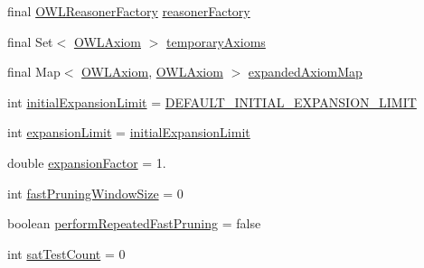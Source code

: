 \begin{DoxyCompactItemize}
\item 
final \hyperlink{interfaceorg_1_1semanticweb_1_1owlapi_1_1reasoner_1_1_o_w_l_reasoner_factory}{O\-W\-L\-Reasoner\-Factory} \hyperlink{classorg_1_1semanticweb_1_1owlapi_1_1debugging_1_1_black_box_o_w_l_debugger_ae2abfae902c03812db4b1cd8bb179612}{reasoner\-Factory}
\item 
final Set$<$ \hyperlink{interfaceorg_1_1semanticweb_1_1owlapi_1_1model_1_1_o_w_l_axiom}{O\-W\-L\-Axiom} $>$ \hyperlink{classorg_1_1semanticweb_1_1owlapi_1_1debugging_1_1_black_box_o_w_l_debugger_a4c86231c49c4d9146765a9574ccf9c08}{temporary\-Axioms}
\item 
final Map$<$ \hyperlink{interfaceorg_1_1semanticweb_1_1owlapi_1_1model_1_1_o_w_l_axiom}{O\-W\-L\-Axiom}, \hyperlink{interfaceorg_1_1semanticweb_1_1owlapi_1_1model_1_1_o_w_l_axiom}{O\-W\-L\-Axiom} $>$ \hyperlink{classorg_1_1semanticweb_1_1owlapi_1_1debugging_1_1_black_box_o_w_l_debugger_a75cb03ea0d932617cbbe4e15f5d596b1}{expanded\-Axiom\-Map}
\item 
int \hyperlink{classorg_1_1semanticweb_1_1owlapi_1_1debugging_1_1_black_box_o_w_l_debugger_a5a9079f603c427f0fcd1765cb940f062}{initial\-Expansion\-Limit} = \hyperlink{classorg_1_1semanticweb_1_1owlapi_1_1debugging_1_1_black_box_o_w_l_debugger_ade79e6d1004a02475754229eb9a36464}{D\-E\-F\-A\-U\-L\-T\-\_\-\-I\-N\-I\-T\-I\-A\-L\-\_\-\-E\-X\-P\-A\-N\-S\-I\-O\-N\-\_\-\-L\-I\-M\-I\-T}
\item 
int \hyperlink{classorg_1_1semanticweb_1_1owlapi_1_1debugging_1_1_black_box_o_w_l_debugger_ace411c1f27e430414abd8a3139b36e50}{expansion\-Limit} = \hyperlink{classorg_1_1semanticweb_1_1owlapi_1_1debugging_1_1_black_box_o_w_l_debugger_a5a9079f603c427f0fcd1765cb940f062}{initial\-Expansion\-Limit}
\item 
double \hyperlink{classorg_1_1semanticweb_1_1owlapi_1_1debugging_1_1_black_box_o_w_l_debugger_a6e6802972b0930d58062b4c54767b74b}{expansion\-Factor} = 1.
\item 
int \hyperlink{classorg_1_1semanticweb_1_1owlapi_1_1debugging_1_1_black_box_o_w_l_debugger_a1d64390609c006064f72a5168395cb83}{fast\-Pruning\-Window\-Size} = 0
\item 
boolean \hyperlink{classorg_1_1semanticweb_1_1owlapi_1_1debugging_1_1_black_box_o_w_l_debugger_a092ddc74dfa75985fd4ae65820b6536a}{perform\-Repeated\-Fast\-Pruning} = false
\item 
int \hyperlink{classorg_1_1semanticweb_1_1owlapi_1_1debugging_1_1_black_box_o_w_l_debugger_a2a0bb4825a276ac34b66898c9d8fee7a}{sat\-Test\-Count} = 0
\end{DoxyCompactItemize}
